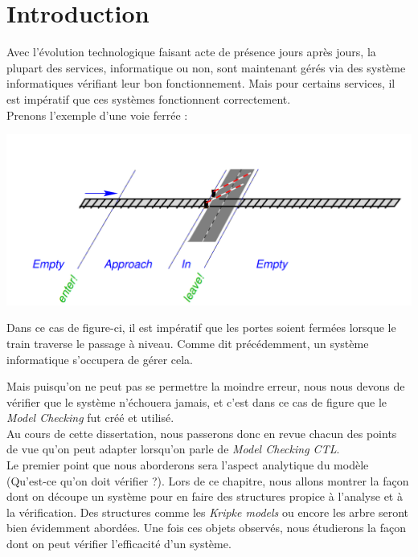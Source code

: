 \documentclass[11pt,a4paper]{article}
\begin{document}
\section{Introduction}

Avec l'évolution technologique faisant acte de présence jours après jours, la plupart des services, informatique ou non, sont maintenant gérés via des système informatiques vérifiant leur bon fonctionnement. Mais pour certains services, il est impératif que ces systèmes fonctionnent correctement.\\


\noindent Prenons l'exemple d'une voie ferrée :

\includegraphics[scale=0.5]{train.png}

\noindent Dans ce cas de figure-ci, il est impératif que les portes soient fermées lorsque le train traverse le passage à niveau. Comme dit précédemment, un système informatique s'occupera de gérer cela.

\noindent Mais puisqu'on ne peut pas se permettre la moindre erreur, nous nous devons de vérifier que le système n'échouera jamais, et c'est dans ce cas de figure que le \textit{Model Checking} fut créé et utilisé.\\

\noindent Au cours de cette dissertation, nous passerons donc en revue chacun des points de vue qu'on peut adapter lorsqu'on parle de \textit{Model Checking CTL}.\\
Le premier point que nous aborderons sera l'aspect analytique du modèle (Qu'est-ce qu'on doit vérifier ?). Lors de ce chapitre, nous allons montrer la façon dont on découpe un système pour en faire des structures propice à l'analyse et à la vérification. Des structures comme les \textit{Kripke models} ou encore les arbre seront bien évidemment abordées. Une fois ces objets observés, nous étudierons la façon dont on peut vérifier l'efficacité d'un système.\\
\end{document}
